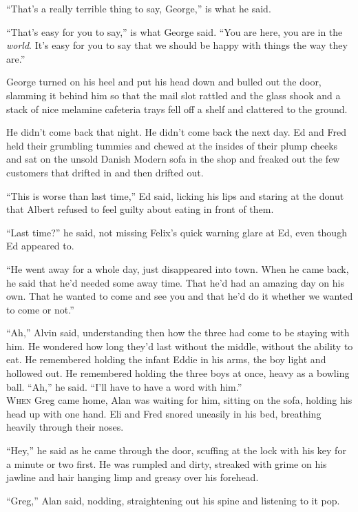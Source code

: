 \documentclass{article}
\begin{document}
``That's a really terrible thing to say, George,'' is what he said.

``That's easy for you to say,'' is what George said.  ``You are here,
you are in the \textit{world}.  It's easy for you to say that we
should be happy with things the way they are.''

George turned on his heel and put his head down and bulled out the
door, slamming it behind him so that the mail slot rattled and the
glass shook and a stack of nice melamine cafeteria trays fell off a
shelf and clattered to the ground.

He didn't come back that night.  He didn't come back the next day.  Ed
and Fred held their grumbling tummies and chewed at the insides of
their plump cheeks and sat on the unsold Danish Modern sofa in the
shop and freaked out the few customers that drifted in and then
drifted out.

``This is worse than last time,'' Ed said, licking his lips and
staring at the donut that Albert refused to feel guilty about eating
in front of them.

``Last time?'' he said, not missing Felix's quick warning glare at Ed,
even though Ed appeared to.

``He went away for a whole day, just disappeared into town.  When he
came back, he said that he'd needed some away time.  That he'd had an
amazing day on his own.  That he wanted to come and see you and that
he'd do it whether we wanted to come or not.''

``Ah,'' Alvin said, understanding then how the three had come to be
staying with him.  He wondered how long they'd last without the
middle, without the ability to eat.  He remembered holding the infant
Eddie in his arms, the boy light and hollowed out.  He remembered
holding the three boys at once, heavy as a bowling ball.  ``Ah,'' he
said.  ``I'll have to have a word with him.''
\\
\lettrine[lines=3, lhang=.5, nindent=0pt, findent=2pt]{W}{hen} Greg came home, Alan was waiting for him, sitting on the sofa,
holding his head up with one hand.  Eli and Fred snored uneasily in
his bed, breathing heavily through their noses.

``Hey,'' he said as he came through the door, scuffing at the lock
with his key for a minute or two first.  He was rumpled and dirty,
streaked with grime on his jawline and hair hanging limp and greasy
over his forehead.

``Greg,'' Alan said, nodding, straightening out his spine and
listening to it pop.
\end{document}
